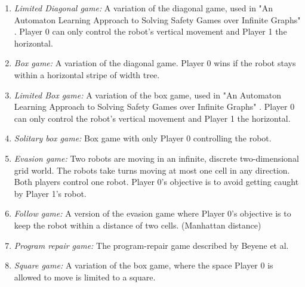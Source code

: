 \documentclass[10pt,a4paper]{article}
\theoremstyle{plain}
\theoremstyle{definition}
\begin{document}
\begin{enumerate}

\item \emph{Limited Diagonal game:} A variation of the diagonal game, used in "An Automaton Learning Approach to Solving Safety Games over Infinite Graphs" \cite{neider2016automaton}. Player 0 can only control the robot's vertical movement and Player 1 the horizontal.
\item \emph{Box game:} A variation of the diagonal game. Player 0 wins if the robot stays within a horizontal stripe of width tree.
\item \emph{Limited Box game:} A variation of the box game, used in "An Automaton Learning Approach to Solving Safety Games over Infinite Graphs" \cite{neider2016automaton}. Player 0 can only control the robot's vertical movement and Player 1 the horizontal.
\item \emph{Solitary box game:} Box game with only Player 0 controlling the robot.
\item \emph{Evasion game:} Two robots are moving in an infinite, discrete two-dimensional grid world. The robots take turns moving at most one cell in any direction. Both players control one robot. Player 0's objective is to avoid getting caught by Player 1's robot.
\item \emph{Follow game:} A version of the evasion game where Player 0's objective is to keep the robot within a distance of two cells. (Manhattan distance)
\item \emph{Program repair game:} The program-repair game described by Beyene et al. \cite{beyene2014constraint}
\item \emph{Square game:} A variation of the box game, where the space Player 0 is allowed to move is limited to a square.

\end{enumerate}
\end{document}
